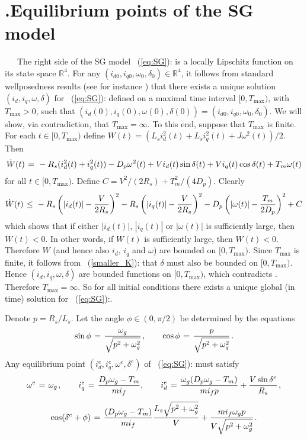 \documentclass[12pt]{article}
\theoremstyle{definition}
\numberwithin{equation}{section}                        %
\newcommand{\BE}{\begin{equation}}
\newcommand{\BEQ}[1]{\BE\mathlabel{#1}} %
\newcommand{\rfb}[1]{\mbox{\rm
   (\ref{#1})}\ifx\undefined\stillediting\else:\fbox{$#1$}\fi}
\newcommand{\rline}  {{\mathbb R}}
\newcommand{\m}      {{\hbox{\hskip 1pt}}}
\renewcommand{\o}    {{\omega}}
\newcommand{\secp}{{\hbox{\hskip -7mm.\hskip 4mm}}}
\let\oldlabel=\label
\renewcommand{\label}[1]{\leavevmode\smash{\raise 10pt\llap
             {\fbox{\scriptsize#1}}}\oldlabel{#1}}
\newcommand{\mathlabel}[1]{\smash{\raise 9pt\llap
             {\scriptsize(#1)}}\label{#1}}
\renewcommand{\label}[1]{\oldlabel{#1}}
\renewcommand{\mathlabel}[1]{\label{#1}}
\begin{document}
\section{\secp Equilibrium points of the SG model} \label{sec3}

\ \ \ The right side of the SG model \rfb{eq:SG} is a locally Lipschitz
function on its state space $\rline^4$. For any $(i_{d0},i_{q0},\o_0,
\delta_0)\in\rline^4$, it follows from standard wellposedness results
(see for instance \cite[Ch.~3]{Kha:02}) that there exists a unique
solution $(i_d,i_q,\o,\delta)$ for \rfb{eq:SG} defined on a maximal time
interval $[0,T_{\max})$, with $T_{\max}>0$, such that $(i_d(0),i_q(0),
\o(0),\delta(0))=(i_{d0},i_{q0},\o_{0},\delta_{0})$. We will show, via
contradiction, that $T_{\max}=\infty$. To this end, suppose that
$T_{\max}$ is finite. For each $t\in[0,T_{\max})$ define $W(t)= (L_s
i_d^2(t)+ L_s i_q^2(t)+J\o^2(t))/2$. Then
$$  \dot W(t) \m=\m -R_s(i_d^2(t)+i_q^2(t))-D_p\o^2(t)+Vi_d(t)\sin
    \delta(t)+Vi_q(t)\cos\delta(t)+T_m\o(t) $$
for all $t\in[0,T_{\max})$. Define $C=V^2/(2R_s)+T_m^2/(4D_p)$.
Clearly
$$  \dot W(t) \m\leq\m -R_s\left(|i_d(t)|-\frac{V}{2R_s}\right)^2
    -R_s\left(|i_q(t)|-\frac{V}{2R_s}\right)^2 - D_p \left(|\o(t)|-
    \frac{T_m}{2D_p}\right)^2 + C $$
which shows that if either $|i_d(t)|$, $|i_q(t)|$ or $|\o(t)|$ is
sufficiently large, then $\dot W(t)<0$. In other words, if $W(t)$ is
sufficiently large, then $\dot W(t)<0$. Therefore $W$ (and hence also
$i_d$, $i_q$ and $\o$) are bounded on $[0,T_{\max})$. Since $T_{\max}$
is finite, it follows from \rfb{smaller_K} that $\delta$ must also be
bounded on $[0, T_{\max})$. Hence $(i_d,i_q,\o,\delta)$ are bounded
functions on $[0,T_{\max})$, which contradicts \cite[Corollary II.3]
{JaWe:09}. Therefore $T_{\max}=\infty$. So for all initial conditions
there exists a unique global (in time) solution for \rfb{eq:SG}.

Denote $p=R_s/L_s$. Let the angle $\phi\in(0,\pi/2)$ be determined by
the equations
\BEQ{phi_def}
   \sin\phi \m=\m \frac{\o_g}{\sqrt{p^2+\o_g^2}} \m, \qquad
   \cos\phi \m=\m \frac{p}{\sqrt{p^2+\o_g^2}} \m.
\end{equation}
Any equilibrium point $(i_d^e,i_q^e,\o^e,\delta^e)$ of \rfb{eq:SG}
must satisfy
\BEQ{fsquared1}
  \o^e \m=\m \o_g \m, \qquad i_q^e \m=\m \frac{D_p\o_g-T_m}{mi_f},
  \qquad i_d^e \m=\m \frac{\o_g (D_p\o_g-T_m)}{m i_f p} +
  \frac{V\sin\delta^e}{R_s}  \m,
\end{equation}
\BEQ{fsquared2}
  \cos(\delta^e+\phi) \m=\m \frac{(D_p\o_g-T_m)}{mi_f} \frac{L_s\sqrt
  {p^2+\o_g^2}}{V} + \frac{mi_f\o_g p}{V\sqrt{p^2+\o_g^2}} \m.
\end{equation}
\end{document}
